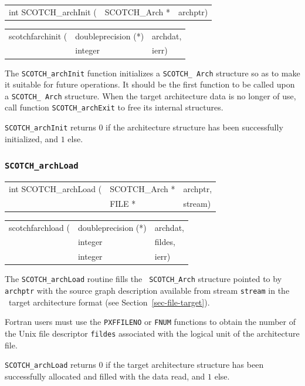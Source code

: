 \begin{itemize}
\progsyn

{\tt\begin{tabular}{l@{}ll}
int SCOTCH\_archInit ( & SCOTCH\_Arch * & archptr)
\end{tabular}}

{\tt\begin{tabular}{l@{}ll}
scotchfarchinit ( & doubleprecision (*) & archdat, \\
                  & integer             & ierr)
\end{tabular}}

\progdes

The {\tt SCOTCH\_archInit} function initializes a {\tt SCOTCH\_\lbt
Arch} structure so as to make it suitable for future operations. It
should be the first function to be called upon a {\tt SCOTCH\_\lbt
Arch} structure.  When the target architecture data is no longer of
use, call function {\tt SCOTCH\_\lbt archExit} to free its internal
structures.

\progret

{\tt SCOTCH\_archInit} returns $0$ if the architecture structure has
been successfully initialized, and $1$ else.
\end{itemize}

\subsubsection{{\tt SCOTCH\_archLoad}}

\begin{itemize}
\progsyn

{\tt\begin{tabular}{l@{}ll}
int SCOTCH\_archLoad ( & SCOTCH\_Arch * & archptr, \\
                       & FILE *         & stream)
\end{tabular}}

{\tt\begin{tabular}{l@{}ll}
scotchfarchload ( & doubleprecision (*) & archdat, \\
                  & integer             & fildes, \\
                  & integer             & ierr)
\end{tabular}}

\progdes

The {\tt SCOTCH\_archLoad} routine fills the {\tt
SCOTCH\_\lbt Arch} structure pointed to by {\tt archptr} with the
source graph description available from stream {\tt stream} in the
\scotch\ target architecture format (see
Section~\ref{sec-file-target}).

Fortran users must use the {\tt PXFFILENO} or {\tt FNUM} functions to
obtain the number of the Unix file descriptor {\tt fildes} associated
with the logical unit of the architecture file.

\progret

{\tt SCOTCH\_archLoad} returns $0$ if the target architecture structure
has been successfully allocated and filled with the data read, and $1$
else.
\end{itemize}

